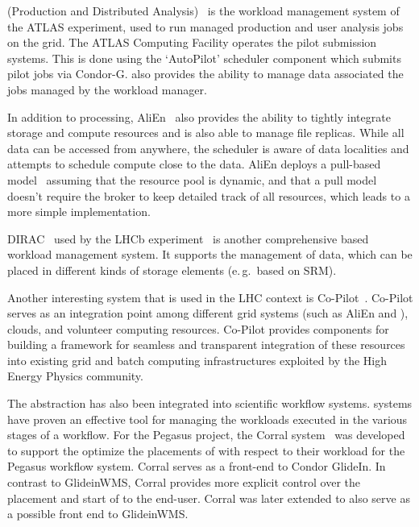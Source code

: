 \documentclass{sig-alternate}
\begin{document}
\panda (Production and Distributed Analysis)~\cite{1742-6596-331-7-072069} is
the workload management system of the ATLAS experiment, used to run managed
production and user analysis jobs on the grid. The ATLAS Computing Facility
operates the pilot submission systems. This is done using the \panda `AutoPilot'
scheduler component which submits pilot jobs via Condor-G. \panda also provides
the ability to manage data associated the jobs managed by the \panda workload
manager.

In addition to processing, AliEn~\cite{1742-6596-119-6-062012} also provides the
ability to tightly integrate storage and compute resources and is also able to
manage file replicas. While all data can be accessed from anywhere, the
scheduler is aware of data localities and attempts to schedule compute close to
the data. AliEn deploys a pull-based model~\cite{Saiz:2003:alien} assuming that
the resource pool is dynamic, and that a pull model doesn't require the broker
to keep detailed track of all resources, which leads to a more simple
implementation.  

DIRAC~\cite{1742-6596-219-6-062049} used by the LHCb experiment~\cite{lhcb} is
another comprehensive \pilot based workload management system.
It supports the management of data, which can be placed in different
kinds of storage elements (e.\,g.\ based on SRM).

Another interesting \pilotjob system that is used in the LHC context is
Co-Pilot~\cite{copilot-tr}. Co-Pilot serves as an integration point among
different grid \pilotjob systems (such as AliEn and \panda), clouds, and
volunteer computing resources. Co-Pilot provides components for building a
framework for seamless and transparent integration of these resources into
existing grid and batch computing infrastructures exploited by the High Energy
Physics community.


The \pilot abstraction has also been integrated into scientific workflow
systems. \pilotjob systems have proven an effective tool for managing the
workloads executed in the various stages of a workflow. For the Pegasus
project\cite{deelman2015}, the Corral
system~\cite{Rynge:2011:EUG:2116259.2116599} was developed to support the
optimize the placements of \pilots with respect to their workload for the
Pegasus workflow system. Corral serves as a front-end to Condor GlideIn. In
contrast to GlideinWMS, Corral provides more explicit control over the placement
and start of \pilots to the end-user. Corral was later extended to also serve as
a possible front end to GlideinWMS.
\end{document}

